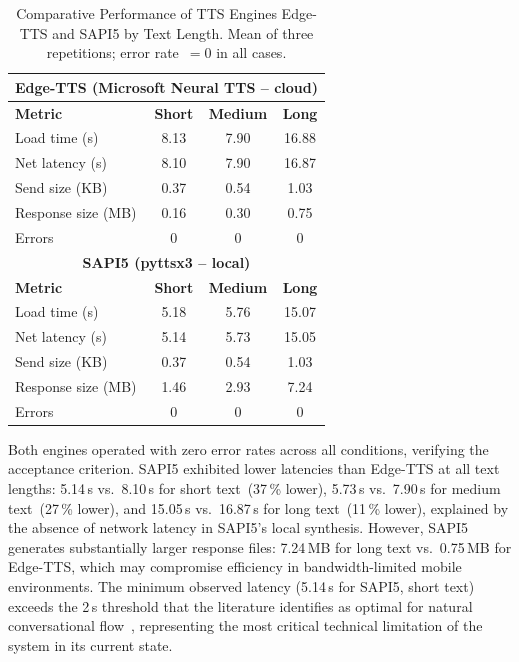 \documentclass[journal]{IEEEtran}
\begin{document}
	\begin{table}[!t]
		\caption{Comparative Performance of TTS Engines Edge-TTS and SAPI5
			by Text Length. Mean of three repetitions; error rate~$=0$ in all cases.}
		\label{tab:tts}
		\centering
		\scriptsize
		\renewcommand{\arraystretch}{1.25}
		\begin{tabular}{lccc}
			\toprule
			\multicolumn{4}{c}{\textbf{Edge-TTS (Microsoft Neural TTS -- cloud)}} \\
			\midrule
			\textbf{Metric} & \textbf{Short} & \textbf{Medium} & \textbf{Long} \\
			\midrule
			Load time (s)          & 8.13  & 7.90  & 16.88 \\
			Net latency (s)        & 8.10  & 7.90  & 16.87 \\
			Send size (KB)         & 0.37  & 0.54  & 1.03  \\
			Response size (MB)     & 0.16  & 0.30  & 0.75  \\
			Errors                 & 0     & 0     & 0     \\
			\midrule
			\multicolumn{4}{c}{\textbf{SAPI5 (pyttsx3 -- local)}} \\
			\midrule
			\textbf{Metric} & \textbf{Short} & \textbf{Medium} & \textbf{Long} \\
			\midrule
			Load time (s)          & 5.18  & 5.76  & 15.07 \\
			Net latency (s)        & 5.14  & 5.73  & 15.05 \\
			Send size (KB)         & 0.37  & 0.54  & 1.03  \\
			Response size (MB)     & 1.46  & 2.93  & 7.24  \\
			Errors                 & 0     & 0     & 0     \\
			\bottomrule
		\end{tabular}
	\end{table}
	
	Both engines operated with zero error rates across all conditions,
	verifying the acceptance criterion.
	SAPI5 exhibited lower latencies than Edge-TTS at all text lengths:
	5.14\,s vs.\ 8.10\,s for short text~(37\,\% lower), 5.73\,s
	vs.\ 7.90\,s for medium text~(27\,\% lower), and 15.05\,s
	vs.\ 16.87\,s for long text~(11\,\% lower), explained by the
	absence of network latency in SAPI5's local synthesis.
	However, SAPI5 generates substantially larger response files:
	7.24\,MB for long text vs.\ 0.75\,MB for Edge-TTS, which may
	compromise efficiency in bandwidth-limited mobile environments.
	The minimum observed latency (5.14\,s for SAPI5, short text)
	exceeds the 2\,s threshold that the literature identifies as
	optimal for natural conversational flow~\cite{tan2021},
	representing the most critical technical limitation of the
	system in its current state.
	
\end{document}
